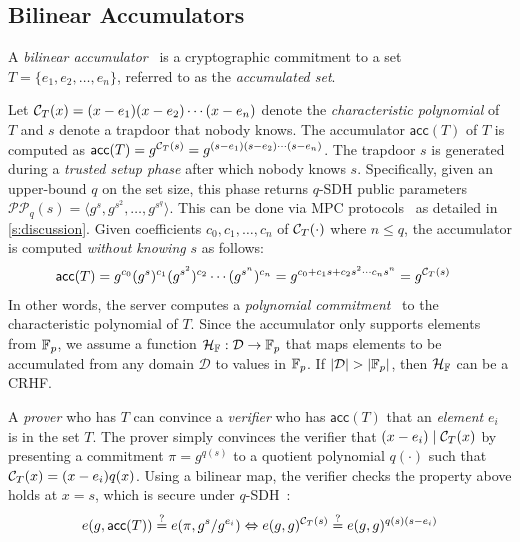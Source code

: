 \subsection{Bilinear Accumulators}
\label{s:prelim:polycommit}
A \textit{bilinear accumulator}~\cite{acc-bilinear,acc-bilinear-nonmemb} is a cryptographic commitment to a set $T = \{e_1, e_2, \dots, e_n\}$, referred to as the \textit{accumulated set}. 

Let $\mathcal{C}_T(x) = (x-e_1)(x-e_2)\cdots(x-e_n)$ denote the \textit{characteristic polynomial} of $T$ and $s$ denote a trapdoor that nobody knows.
The accumulator $\mathsf{acc}(T)$ of $T$ is computed as $\mathsf{acc}(T) = g^{\mathcal{C}_T(s)} = g^{(s-e_1)(s-e_2)\cdots(s-e_n)}$.
The trapdoor $s$ is generated during a \textit{trusted setup phase} after which nobody knows $s$.
Specifically, given an upper-bound $q$ on the set size, this phase returns $q$-SDH public parameters $\mathcal{PP}_q(s) = \langle g^s, g^{s^2},\allowbreak \dots, g^{s^q}\rangle$.
This can be done via MPC protocols~\cite{zcash-mpc1,zcash-mpc2,KiayiasOksuzTang2015} as detailed in \cref{s:discussion}.
Given coefficients $c_0, c_1, \dots, c_{n}$ of $\mathcal{C}_T(\cdot)$ where $n \le q$, the accumulator is computed \textit{without knowing} $s$ as follows:
\begin{align*}
\small
\mathsf{acc}(T)
    &= g^{c_0} (g^s)^{c_1} (g^{s^2})^{c_2} \cdots (g^{s^{n}})^{c_{n}}
    = g^{c_0 + c_1 s + c_2 s^2 \cdots c_{n} s^{n}}
    = g^{\mathcal{C}_T(s)}
\end{align*}
In other words, the server computes a \textit{polynomial commitment}~\cite{acc-bilinear,polycommit} to the characteristic polynomial of $T$.
Since the accumulator only supports elements from $\mathbb{F}_p$, we assume a function $\mathcal{H}_{\mathbb{F}}: \mathcal{D}\rightarrow \mathbb{F}_p$ that maps elements to be accumulated from any domain $\mathcal{D}$ to values in $\mathbb{F}_p$.
If $|\mathcal{D}|>|\Fp|$, then $\mathcal{H}_{\mathbb{F}}$ can be a CRHF.

A \textit{prover} who has $T$ can convince a \textit{verifier} who has $\mathsf{acc}(T)$ that an \textit{element} $e_i$ is in the set $T$.
The prover simply convinces the verifier that $(x-e_i) \mathrel| \mathcal{C}_T(x)$ by presenting a commitment $\pi=g^{q(s)}$ to a quotient polynomial $q(\cdot)$ such that $\mathcal{C}_T(x) = (x-e_i)q(x)$.
Using a bilinear map, the verifier checks the property above holds at $x=s$, which is secure under $q$-SDH~\cite{polycommit}:
\begin{align*}
e(g, \mathsf{acc}(T)) \stackrel{?}{=} e(\pi, g^s / g^{e_i}) \Leftrightarrow
e(g, g)^{\mathcal{C}_T(s)} \stackrel{?}{=} e(g,g)^{q(s)(s-e_i)}
\end{align*}

